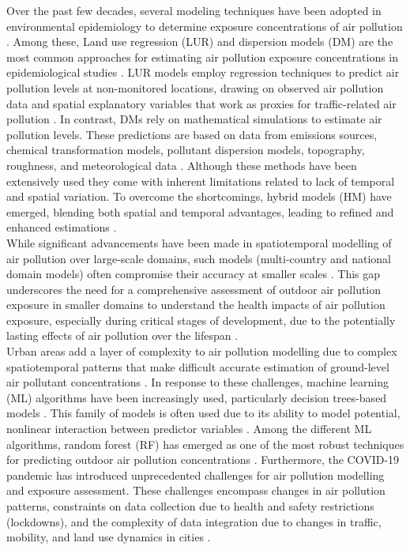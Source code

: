 \documentclass{article}
\begin{document}
Over the past few decades, several modeling techniques have been adopted in environmental epidemiology to determine exposure concentrations of air pollution \cite{hoek2017, di2019no2, di2019pm25, stafoggia2019, stafoggia2020}. Among these, Land use regression (LUR) and dispersion models (DM) are the most common approaches for estimating air pollution exposure concentrations in epidemiological studies \cite{gulliver2015, dehoogh2014}. LUR models employ regression techniques to predict air pollution levels at non-monitored locations, drawing on observed air pollution data and spatial explanatory variables that work as proxies for traffic-related air pollution \cite{briggs1997, hoek2008}. In contrast, DMs rely on mathematical simulations to estimate air pollution levels. These predictions are based on data from emissions sources, chemical transformation models, pollutant dispersion models, topography, roughness, and meteorological data \cite{hoek2017}. Although these methods have been extensively used they come with inherent limitations related to lack of temporal and spatial variation. To overcome the shortcomings, hybrid models (HM) have emerged, blending both spatial and temporal advantages, leading to refined and enhanced estimations \cite{hoek2017, korek2017, tularam2021, oh2021}. \\

While significant advancements have been made in spatiotemporal modelling of air pollution over large-scale domains, such models (multi-country and national domain models) often compromise their accuracy at smaller scales \cite{dehoogh2016, chen2019, chen2020, shen2022}. This gap underscores the need for a comprehensive assessment of outdoor air pollution exposure in smaller domains to understand the health impacts of air pollution exposure, especially during critical stages of development, due to the potentially lasting effects of air pollution over the lifespan \cite{selevan2000, wick2010, ghosh2021}. \\

Urban areas add a layer of complexity to air pollution modelling due to complex spatiotemporal patterns that make difficult accurate estimation of ground-level air pollutant concentrations \cite{sokhi2022}. In response to these challenges, machine learning (ML) algorithms have been increasingly used, particularly decision trees-based models \cite{liu2022}. This family of models is often used due to its ability to model potential, nonlinear interaction between predictor variables \cite{liu2022treebased}. Among the different ML algorithms, random forest (RF) has emerged as one of the most robust techniques for predicting outdoor air pollution concentrations \cite{chen2019, chen2020, stafoggia2019, stafoggia2020, schneider2020, mila2023}. Furthermore, the COVID-19 pandemic has introduced unprecedented challenges for air pollution modelling and exposure assessment. These challenges encompass changes in air pollution patterns, constraints on data collection due to health and safety restrictions (lockdowns), and the complexity of data integration due to changes in traffic, mobility, and land use dynamics in cities \cite{gonzalez2022, querol2021}. \\
 
\end{document}
